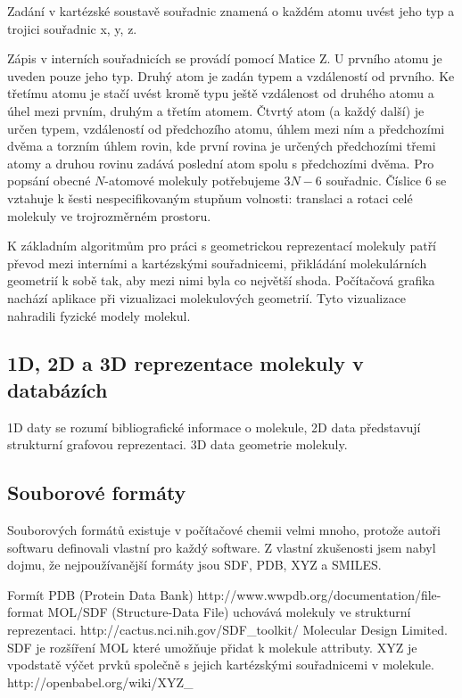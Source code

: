 \documentclass[10pt,draft,oneside]{fithesis2}
\begin{document}
Zadání v kartézské soustavě souřadnic znamená o každém atomu uvést jeho typ a trojici souřadnic x, y, z.

Zápis v interních souřadnicích se provádí pomocí Matice Z. U prvního atomu je uveden pouze jeho typ. Druhý atom je zadán typem a vzdáleností od prvního. Ke třetímu atomu je stačí uvést kromě typu ještě vzdálenost od druhého atomu a úhel mezi prvním, druhým a třetím atomem. Čtvrtý atom (a každý další) je určen typem, vzdáleností od předchozího atomu, úhlem mezi ním a předchozími dvěma a torzním úhlem rovin, kde první rovina je určených předchozími třemi atomy a druhou rovinu zadává poslední atom spolu s předchozími dvěma. Pro popsání obecné $N$-atomové molekuly potřebujeme $3N-6$ souřadnic. Číslice 6 se vztahuje k šesti nespecifikovaným stupňum volnosti: translaci a rotaci celé molekuly ve trojrozměrném prostoru.

K základním algoritmům pro práci s geometrickou reprezentací molekuly patří převod mezi interními a kartézskými souřadnicemi, přikládání molekulárních geometrií k sobě tak, aby mezi nimi byla co největší shoda. Počítačová grafika nachází aplikace při vizualizaci molekulových geometrií. Tyto vizualizace nahradili fyzické modely molekul.

\subsection{1D, 2D a 3D reprezentace molekuly v databázích}

1D daty se rozumí bibliografické informace o molekule, 2D data představují strukturní grafovou reprezentaci. 3D data geometrie molekuly.

\subsection{Souborové formáty}

Souborových formátů existuje v počítačové chemii velmi mnoho, protože autoři softwaru definovali vlastní pro každý software. Z vlastní zkušenosti jsem nabyl dojmu, že nejpoužívanější formáty jsou SDF, PDB, XYZ a SMILES.

Formít PDB (Protein Data Bank) http://www.wwpdb.org/documentation/file-format MOL/SDF (Structure-Data File) uchovává molekuly ve strukturní reprezentaci. http://cactus.nci.nih.gov/SDF_toolkit/ Molecular Design Limited. SDF je rozšíření MOL které umožňuje přidat k molekule attributy. XYZ je vpodstatě výčet prvků společně s jejich kartézskými souřadnicemi v molekule. http://openbabel.org/wiki/XYZ_%
\end{document}
